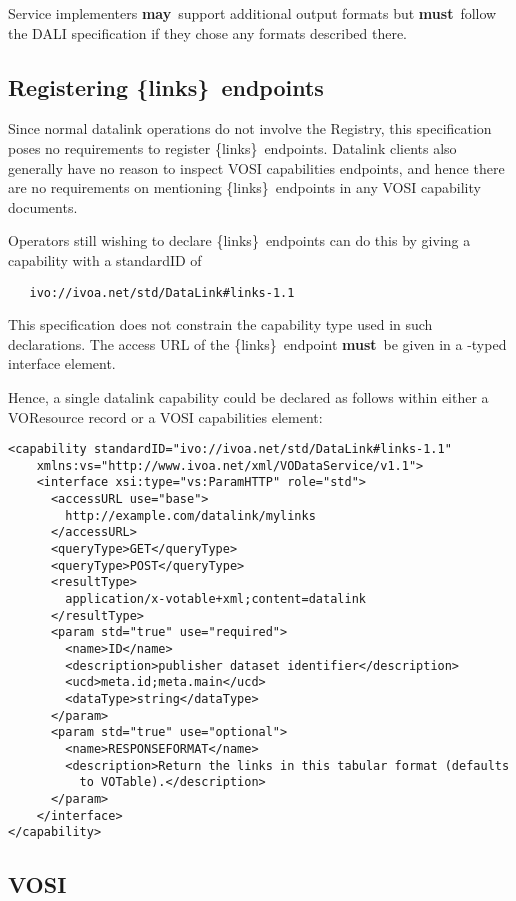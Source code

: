 \documentclass[11pt,a4paper]{ivoa}
\newcommand{\blinks}{\{links\}}
\newcommand{\rfcmust}{\textbf{must}}
\newcommand{\rfcmay}{\textbf{may}}
\begin{document}
Service implementers \rfcmay\ support additional output formats but \rfcmust\ follow
the DALI specification if they chose any formats described there.


\subsection{Registering \blinks\ endpoints}
\label{sec:capability}

Since normal datalink operations do not involve the Registry, this
specification poses no requirements to register \blinks\ endpoints.
Datalink clients also generally have no reason to inspect VOSI
capabilities endpoints, and hence there are no requirements on
mentioning \blinks\ endpoints in any VOSI capability documents.

Operators still wishing to declare \blinks\ endpoints can do this by
giving a capability with a standardID of
\begin{verbatim}
   ivo://ivoa.net/std/DataLink#links-1.1
\end{verbatim}
This specification does not constrain the capability type used in such
declarations.  The access URL of the \blinks\ endpoint \rfcmust\ be given in a
-typed interface element.

Hence, a single datalink capability could be declared as follows within
either a VOResource record or a VOSI capabilities element:

\begin{verbatim}
<capability standardID="ivo://ivoa.net/std/DataLink#links-1.1"
    xmlns:vs="http://www.ivoa.net/xml/VODataService/v1.1">
    <interface xsi:type="vs:ParamHTTP" role="std">
      <accessURL use="base">
        http://example.com/datalink/mylinks
      </accessURL>
      <queryType>GET</queryType>
      <queryType>POST</queryType>
      <resultType>
        application/x-votable+xml;content=datalink
      </resultType>
      <param std="true" use="required">
        <name>ID</name>
        <description>publisher dataset identifier</description>
        <ucd>meta.id;meta.main</ucd>
        <dataType>string</dataType>
      </param>
      <param std="true" use="optional">
        <name>RESPONSEFORMAT</name>
        <description>Return the links in this tabular format (defaults
          to VOTable).</description>
      </param>
    </interface>
</capability>
\end{verbatim}

\subsection{VOSI}
\label{sec:vosi}
\end{document}
